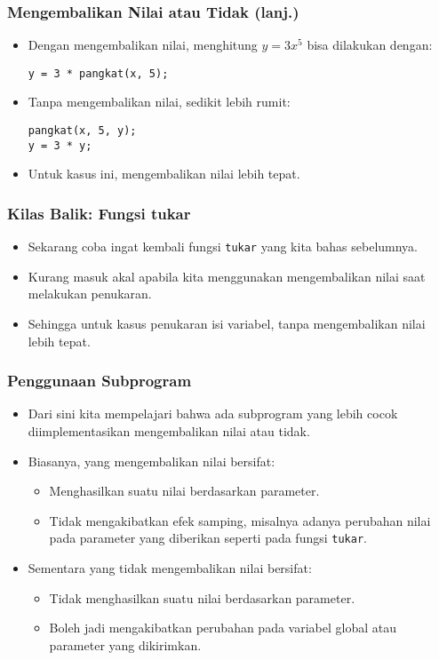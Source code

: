 \begin{frame}[fragile]
\frametitle{Mengembalikan Nilai atau Tidak (lanj.)}
\begin{itemize}
  \item Dengan mengembalikan nilai, menghitung $y = 3x^5$ bisa dilakukan dengan:
\begin{lstlisting}
y = 3 * pangkat(x, 5);
\end{lstlisting}

  \item Tanpa mengembalikan nilai, sedikit lebih rumit:
\begin{lstlisting}
pangkat(x, 5, y);
y = 3 * y;
\end{lstlisting}

  \item Untuk kasus ini, \alert{mengembalikan nilai lebih tepat}.
\end{itemize}
\end{frame}

\begin{frame}
\frametitle{Kilas Balik: Fungsi tukar}
\begin{itemize}
  \item Sekarang coba ingat kembali fungsi \texttt{tukar} yang kita bahas sebelumnya.
  \item Kurang masuk akal apabila kita menggunakan mengembalikan nilai saat melakukan penukaran.
  \item Sehingga untuk kasus penukaran isi variabel, \alert{tanpa mengembalikan nilai lebih tepat}.
\end{itemize}
\end{frame}

\begin{frame}
\frametitle{Penggunaan Subprogram}
\begin{itemize}
  \item Dari sini kita mempelajari bahwa ada subprogram yang lebih cocok diimplementasikan mengembalikan nilai atau tidak.
  \item Biasanya, yang mengembalikan nilai bersifat:
  \begin{itemize}
    \item Menghasilkan suatu nilai berdasarkan parameter.
    \item Tidak mengakibatkan efek samping, misalnya adanya perubahan nilai pada parameter yang diberikan seperti pada fungsi \texttt{tukar}.
  \end{itemize}
  \item Sementara yang tidak mengembalikan nilai bersifat:
  \begin{itemize}
    \item Tidak menghasilkan suatu nilai berdasarkan parameter.
    \item Boleh jadi mengakibatkan perubahan pada variabel global atau parameter yang dikirimkan.
  \end{itemize}
\end{itemize}
\end{frame}

